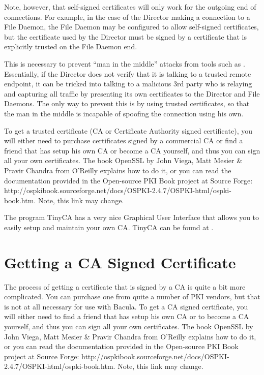 Note, however, that self-signed certificates will only work for the
outgoing end of connections.  For example, in the case of the Director
making a connection to a File Daemon, the File Daemon may be configured to
allow self-signed certificates, but the certificate used by the
Director must be signed by a certificate that is explicitly trusted on the
File Daemon end.

This is necessary to prevent ``man in the middle'' attacks from tools such
as .  Essentially, if the
Director does not verify that it is talking to a trusted remote endpoint,
it can be tricked into talking to a malicious 3rd party who is relaying and
capturing all traffic by presenting its own certificates to the Director
and File Daemons.  The only way to prevent this is by using trusted
certificates, so that the man in the middle is incapable of spoofing the
connection using his own.

To get a trusted certificate (CA or Certificate Authority signed
certificate), you will either need to purchase certificates signed by a
commercial CA or find a friend that has setup his own CA or become a CA
yourself, and thus you can sign all your own certificates.  The book
OpenSSL by John Viega, Matt Mesier \& Pravir Chandra from O'Reilly explains
how to do it, or you can read the documentation provided in the Open-source
PKI Book project at Source Forge: 
{http://ospkibook.sourceforge.net/docs/OSPKI-2.4.7/OSPKI-html/ospki-book.htm}.
Note, this link may change. 

The program TinyCA has a very nice Graphical User Interface 
that allows you to easily setup and maintain your own CA.
TinyCA can be found at
.


\section{Getting a CA Signed Certificate}

The process of getting a certificate that is signed by a CA is quite a bit
more complicated. You can purchase one from quite a number of PKI vendors, but
that is not at all necessary for use with Bacula. To get a CA signed
certificate, you will either need to find a friend that has setup his own CA
or to become a CA yourself, and thus you can sign all your own certificates.
The book OpenSSL by John Viega, Matt Mesier \& Pravir Chandra from O'Reilly
explains how to do it, or you can read the documentation provided in the
Open-source PKI Book project at Source Forge: 
{http://ospkibook.sourceforge.net/docs/OSPKI-2.4.7/OSPKI-html/ospki-book.htm}.
Note, this link may change. 

